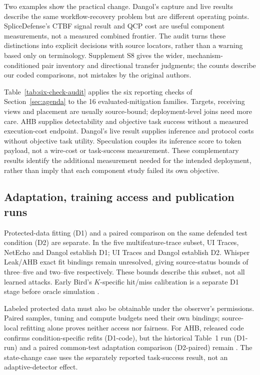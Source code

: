 Two examples show the practical change. Dangol's capture and live results describe the same workflow-recovery problem but are different operating points. SpliceDefense's CTBF signal result and QCP cost are useful component measurements, not a measured combined frontier. The audit turns these distinctions into explicit decisions with source locators, rather than a warning based only on terminology. Supplement S8 gives the wider, mechanism-conditioned pair inventory and directional transfer judgments; the counts describe our coded comparisons, not mistakes by the original authors.

Table~\ref{tab:six-check-audit} applies the six reporting checks of Section~\ref{sec:agenda} to the 16 evaluated-mitigation families. Targets, receiving views and placement are usually source-bound; deployment-level joins need more care. AHB supplies detectability and objective task success without a measured execution-cost endpoint. Dangol's live result supplies inference and protocol costs without objective task utility. Speculation couples its inference score to token payload, not a wire-cost or task-success measurement. These complementary results identify the additional measurement needed for the intended deployment, rather than imply that each component study failed its own objective.


\subsection{Adaptation, training access and publication runs}
Protected-data fitting (D1) and a paired comparison on the same defended test condition (D2) are separate. In the five multifeature-trace subset, UI Traces, NetEcho and Dangol establish D1; UI Traces and Dangol establish D2. Whisper Leak/AHB exact fit bindings remain unresolved, giving source-status bounds of three--five and two--five respectively. These bounds describe this subset, not all learned attacks. Early Bird's $K$-specific hit/miss calibration is a separate D1 stage before oracle simulation \cite{earlybird2025}.

Labeled protected data must also be obtainable under the observer's permissions. Paired samples, tuning and compute budgets need their own bindings; source-local refitting alone proves neither access nor fairness. For AHB, released code confirms condition-specific refits (D1-code), but the historical Table~1 run (D1-run) and a paired common-test adaptation comparison (D2-paired) remain \NRV{} \cite{zhu2026turing}. The state-change case uses the separately reported task-success result, not an adaptive-detector effect.

